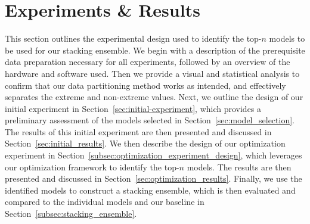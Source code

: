\section{Experiments \& Results}\label{sec:methodology}
This section outlines the experimental design used to identify the top-$n$ models to be used for our stacking ensemble.
We begin with a description of the prerequisite data preparation necessary for all experiments, followed by an overview of the hardware and software used.
Then we provide a visual and statistical analysis to confirm that our data partitioning method works as intended, and effectively separates the extreme and non-extreme values.
Next, we outline the design of our initial experiment in Section~\ref{sec:initial-experiment}, which provides a preliminary assessment of the models selected in Section~\ref{sec:model_selection}.
The results of this initial experiment are then presented and discussed in Section~\ref{sec:initial_results}.
We then describe the design of our optimization experiment in Section~\ref{subsec:optimization_experiment_design}, which leverages our optimization framework to identify the top-$n$ models.
The results are then presented and discussed in Section~\ref{sec:optimization_results}.
Finally, we use the identified models to construct a stacking ensemble, which is then evaluated and compared to the individual models and our baseline in Section~\ref{subsec:stacking_ensemble}.










